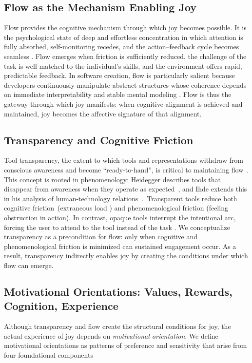 \documentclass[12pt]{elsarticle}
\begin{document}
\subsection{Flow as the Mechanism Enabling Joy}

Flow provides the cognitive mechanism through which joy becomes possible. It is 
the psychological state of deep and effortless concentration in which attention 
is fully absorbed, self-monitoring recedes, and the action--feedback cycle 
becomes seamless \cite{csikszentmihalyi1990flow}. Flow emerges when friction is 
sufficiently reduced, the challenge of the task is well-matched to the 
individual's skills, and the environment offers rapid, predictable feedback. In 
software creation, flow is particularly salient because developers continuously 
manipulate abstract structures whose coherence depends on immediate 
interpretability and stable mental modeling \cite{ford2015exploring}. Flow is 
thus the gateway through which joy manifests: when cognitive alignment is 
achieved and maintained, joy becomes the affective signature of that alignment.

\subsection{Transparency and Cognitive Friction}

Tool transparency, the extent to which tools and representations withdraw
from conscious awareness and become ``ready-to-hand'', is critical to
maintaining flow~\cite{kramer2007abstraction}. This concept is rooted in phenomenology: Heidegger describes
tools that disappear from awareness when they operate as expected~\cite{heidegger1962being}, and Ihde extends this in his analysis of human-technology
relations~\cite{ihde1990technology}.~Transparent tools reduce both cognitive
friction~(extraneous load \cite{sweller1988cognitive}) and phenomenological
friction (feeling obstruction in action). In contrast, opaque tools interrupt
the intentional arc, forcing the user to attend to the tool instead of the
task \cite{hutchins1995cognition}. We conceptualize transparency as a
precondition for flow: only when cognitive and phenomenological friction is
minimized can sustained engagement occur. As a result, transparency indirectly
enables joy by creating the conditions under which flow can emerge.

\subsection{Motivational Orientations: Values, Rewards, Cognition, Experience}\label{sec:orientations}
Although transparency and flow create the structural conditions for joy, the
actual experience of joy depends on \textit{motivational orientation}. We
define motivational orientations as patterns of preference and sensitivity
that arise from four foundational components
\end{document}
